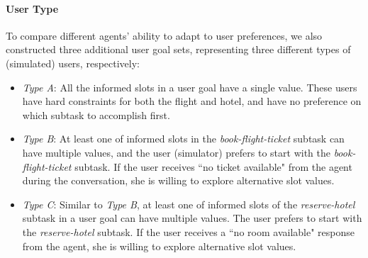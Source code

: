 \documentclass[11pt,letterpaper]{article}
\begin{document}
\paragraph{User Type} To compare different agents' ability to adapt to user preferences, we also constructed three additional user goal sets, representing three different types of (simulated) users, respectively:
\begin{itemize}
%
\item \textit{Type A}: All the informed slots in a user goal have a single value.  These users have hard constraints for both the flight and hotel, and have no preference on which subtask to accomplish first. 
%
\item \textit{Type B}: At least one of informed slots in the \textit{book-flight-ticket} subtask can have multiple values, and the user (simulator) prefers to start with the \textit{book-flight-ticket} subtask. If the user receives ``no ticket available" from the agent during the conversation, she is willing to explore alternative slot values.
\item \textit{Type C}: Similar to \emph{Type B}, at least one of informed slots of the \textit{reserve-hotel} subtask in a user goal can have multiple values. The user prefers to start with the \textit{reserve-hotel} subtask. If the user receives a ``no room available" response from the agent, she is willing to explore alternative slot values.
%
\end{itemize}
\end{document}

